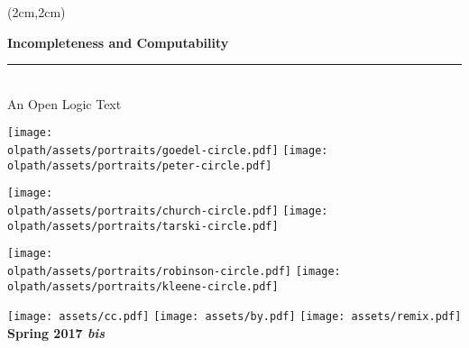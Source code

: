 
\thispagestyle{empty}

\pagecolor{leadbeater}
  \begin{textblock*}{14cm}(2cm,2cm)%
    \begin{raggedright}
      \fontsize{32pt}{34pt}\selectfont\bfseries\sffamily%
      Incompleteness and Computability\\
      \normalfont\fontsize{18pt}{0pt}\selectfont\bfseries\itshape%
      \rule{14cm}{5pt}\\[5pt]
      An Open Logic Text
    \end{raggedright}

\vskip1cm

\noindent\texttt{[image: \\olpath/assets/portraits/goedel-circle.pdf]}
\texttt{[image: \\olpath/assets/portraits/peter-circle.pdf]}\\
\centerline{\texttt{[image: \\olpath/assets/portraits/church-circle.pdf]}
\texttt{[image: \\olpath/assets/portraits/tarski-circle.pdf]}}

\hfill\texttt{[image: \\olpath/assets/portraits/robinson-circle.pdf]}
\texttt{[image: \\olpath/assets/portraits/kleene-circle.pdf]}

\vskip1cm

\noindent
\texttt{[image: assets/cc.pdf]}
\texttt{[image: assets/by.pdf]}
\texttt{[image: assets/remix.pdf]}
\normalfont\fontsize{16pt}{0pt}\selectfont\bfseries\sffamily%
\hfill Spring 2017 \textit{bis}
\end{textblock*}
\

\clearpage
\setcounter{page}{1}
\nopagecolor


